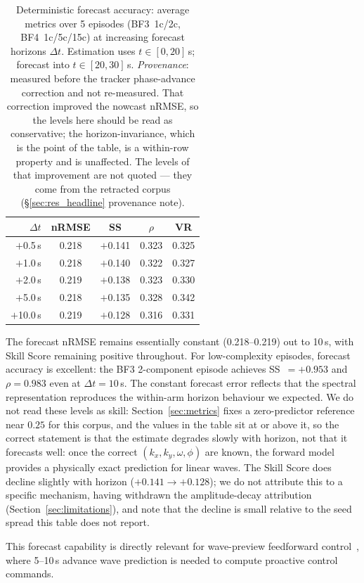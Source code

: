 \begin{table}[t]
\centering
\caption{Deterministic forecast accuracy: average metrics over 5 episodes
(BF3~1c/2c, BF4~1c/5c/15c) at increasing forecast horizons $\Delta t$.
Estimation uses $t \in [0, 20]$\,s; forecast into $t \in [20, 30]$\,s.
\emph{Provenance}: measured before the tracker phase-advance correction
and not re-measured.  That correction improved the nowcast nRMSE, so the levels
here should be read as conservative; the horizon-invariance, which is the point of
the table, is a within-row property and is unaffected.
The levels of that improvement are not quoted --- they come from the retracted
corpus (\S\ref{sec:res_headline} provenance note).}
\label{tab:forecast}
\begin{tabular}{rcccc}
\toprule
$\Delta t$ & nRMSE & SS & $\rho$ & VR \\
\midrule
$+$0.5\,s  & 0.218 & $+$0.141 & 0.323 & 0.325 \\
$+$1.0\,s  & 0.218 & $+$0.140 & 0.322 & 0.327 \\
$+$2.0\,s  & 0.219 & $+$0.138 & 0.323 & 0.330 \\
$+$5.0\,s  & 0.218 & $+$0.135 & 0.328 & 0.342 \\
$+$10.0\,s & 0.219 & $+$0.128 & 0.316 & 0.331 \\
\bottomrule
\end{tabular}
\end{table}

The forecast nRMSE remains essentially constant (0.218--0.219) out to
10\,s, with Skill Score remaining positive throughout.
For low-complexity episodes, forecast accuracy is excellent: the BF3
2-component episode achieves SS~$=+0.953$ and $\rho=0.983$ even at
$\Delta t = 10$\,s.  The constant forecast error reflects that the
spectral representation reproduces the within-arm horizon behaviour we expected. We do not read these levels as skill: Section~\ref{sec:metrics} fixes a zero-predictor reference near $0.25$ for this corpus, and the values in the table sit at or above it, so the correct statement is that the estimate degrades slowly with horizon, not that it forecasts well:
once the correct $(k_x, k_y, \omega, \phi)$ are known, the forward
model provides a physically exact prediction for linear waves.
The Skill Score does decline slightly with horizon
($+0.141 \to +0.128$); we do not attribute this to a specific mechanism,
having withdrawn the amplitude-decay attribution
(Section~\ref{sec:limitations}), and note that the decline is small
relative to the seed spread this table does not report.

This forecast capability is directly relevant for wave-preview
feedforward control~\citep{park2026hydrofoil}, where 5--10\,s advance
wave prediction is needed to compute proactive control commands.

